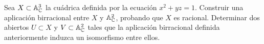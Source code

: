 \documentclass[twoside]{article}
\begin{document}
\newpage

\begin{ejercicio}{2} Sea $X\subset \mathbb{A}^3_{\mathbb{C}}$ la cuádrica definida por la ecuación $x^2 + yz =1$. Construir una aplicación birracional entre $X$ y $\mathbb{A}^2_{\mathbb{C}}$, probando que $X$ es racional. Determinar dos abiertos $U\subset X$ y $V\subset \mathbb{A}^2_{\mathbb{C}}$ tales que la aplicación birracional definida anteriormente induzca un isomorfismo entre ellos.
\end{ejercicio}
\begin{solucion}
\end{solucion}
\newpage 
\end{document}
